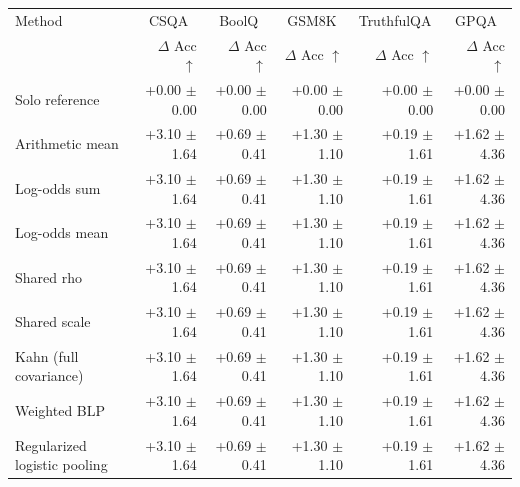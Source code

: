 \begin{tabular}{lrrrrr}
\toprule
Method & \multicolumn{1}{c}{CSQA} & \multicolumn{1}{c}{BoolQ} & \multicolumn{1}{c}{GSM8K} & \multicolumn{1}{c}{TruthfulQA} & \multicolumn{1}{c}{GPQA} \\
 & $\Delta$ Acc $\uparrow$ & $\Delta$ Acc $\uparrow$ & $\Delta$ Acc $\uparrow$ & $\Delta$ Acc $\uparrow$ & $\Delta$ Acc $\uparrow$ \\
\midrule
Solo reference & +0.00 {\scriptsize $\pm$ 0.00} & +0.00 {\scriptsize $\pm$ 0.00} & +0.00 {\scriptsize $\pm$ 0.00} & +0.00 {\scriptsize $\pm$ 0.00} & +0.00 {\scriptsize $\pm$ 0.00} \\
Arithmetic mean & +3.10 {\scriptsize $\pm$ 1.64} & +0.69 {\scriptsize $\pm$ 0.41} & +1.30 {\scriptsize $\pm$ 1.10} & +0.19 {\scriptsize $\pm$ 1.61} & +1.62 {\scriptsize $\pm$ 4.36} \\
Log-odds sum & +3.10 {\scriptsize $\pm$ 1.64} & +0.69 {\scriptsize $\pm$ 0.41} & +1.30 {\scriptsize $\pm$ 1.10} & +0.19 {\scriptsize $\pm$ 1.61} & +1.62 {\scriptsize $\pm$ 4.36} \\
Log-odds mean & +3.10 {\scriptsize $\pm$ 1.64} & +0.69 {\scriptsize $\pm$ 0.41} & +1.30 {\scriptsize $\pm$ 1.10} & +0.19 {\scriptsize $\pm$ 1.61} & +1.62 {\scriptsize $\pm$ 4.36} \\
Shared rho & +3.10 {\scriptsize $\pm$ 1.64} & +0.69 {\scriptsize $\pm$ 0.41} & +1.30 {\scriptsize $\pm$ 1.10} & +0.19 {\scriptsize $\pm$ 1.61} & +1.62 {\scriptsize $\pm$ 4.36} \\
Shared scale & +3.10 {\scriptsize $\pm$ 1.64} & +0.69 {\scriptsize $\pm$ 0.41} & +1.30 {\scriptsize $\pm$ 1.10} & +0.19 {\scriptsize $\pm$ 1.61} & +1.62 {\scriptsize $\pm$ 4.36} \\
Kahn (full covariance) & +3.10 {\scriptsize $\pm$ 1.64} & +0.69 {\scriptsize $\pm$ 0.41} & +1.30 {\scriptsize $\pm$ 1.10} & +0.19 {\scriptsize $\pm$ 1.61} & +1.62 {\scriptsize $\pm$ 4.36} \\
Weighted BLP & +3.10 {\scriptsize $\pm$ 1.64} & +0.69 {\scriptsize $\pm$ 0.41} & +1.30 {\scriptsize $\pm$ 1.10} & +0.19 {\scriptsize $\pm$ 1.61} & +1.62 {\scriptsize $\pm$ 4.36} \\
Regularized logistic pooling & +3.10 {\scriptsize $\pm$ 1.64} & +0.69 {\scriptsize $\pm$ 0.41} & +1.30 {\scriptsize $\pm$ 1.10} & +0.19 {\scriptsize $\pm$ 1.61} & +1.62 {\scriptsize $\pm$ 4.36} \\

\end{tabular}
